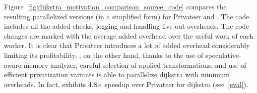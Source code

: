 

Figure~\ref{fig:dijkstra_motivation_comparison_source_code} compares
the resulting parallelized versions (in a simplified form) for
Privateer and \namensp. The code includes all the added checks,
logging and handling live-out overheads. The code changes are marked
with the average added overhead over the useful work of each worker.
It is clear that Privateer introduces a lot of added overhead
considerably limiting its profitability. \namensp, on the other hand,
thanks to the use of speculative-aware memory analyzer, careful
selection of applied transformations, and use of efficient
privatization variants is able to parallelize dijkstra with minimum
overheads. In fact, \name exhibits 4.8$\times$ speedup over Privateer
for dijkstra (see~\ref{eval}).


%
%
%
%
%
%
